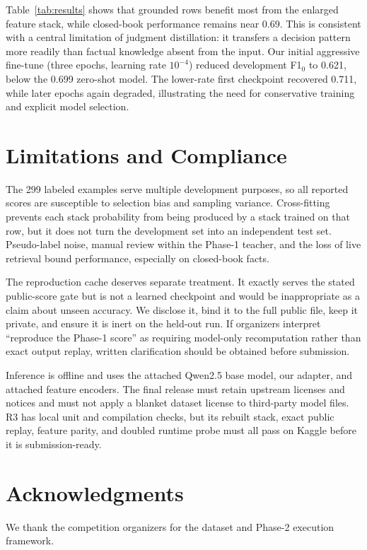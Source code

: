\documentclass[11pt]{article}
\begin{document}
Table~\ref{tab:results} shows that grounded rows benefit most from the enlarged
feature stack, while closed-book performance remains near 0.69. This is consistent
with a central limitation of judgment distillation: it transfers a decision pattern
more readily than factual knowledge absent from the input. Our initial aggressive
fine-tune (three epochs, learning rate $10^{-4}$) reduced development F1$_0$ to 0.621,
below the 0.699 zero-shot model. The lower-rate first checkpoint recovered 0.711,
while later epochs again degraded, illustrating the need for conservative training
and explicit model selection.

\section{Limitations and Compliance}

The 299 labeled examples serve multiple development purposes, so all reported scores
are susceptible to selection bias and sampling variance. Cross-fitting prevents each
stack probability from being produced by a stack trained on that row, but it does not
turn the development set into an independent test set. Pseudo-label noise, manual
review within the Phase-1 teacher, and the loss of live retrieval bound performance,
especially on closed-book facts.

The reproduction cache deserves separate treatment. It exactly serves the stated
public-score gate but is not a learned checkpoint and would be inappropriate as a
claim about unseen accuracy. We disclose it, bind it to the full public file, keep it
private, and ensure it is inert on the held-out run. If organizers interpret
``reproduce the Phase-1 score'' as requiring model-only recomputation rather than
exact output replay, written clarification should be obtained before submission.

Inference is offline and uses the attached Qwen2.5 base model, our adapter, and
attached feature encoders. The final release must retain upstream licenses and notices
and must not apply a blanket dataset license to third-party model files. R3 has local
unit and compilation checks, but its rebuilt stack, exact public replay, feature parity,
and doubled runtime probe must all pass on Kaggle before it is submission-ready.

\section*{Acknowledgments}
We thank the competition organizers for the dataset and Phase-2 execution framework.
\end{document}
